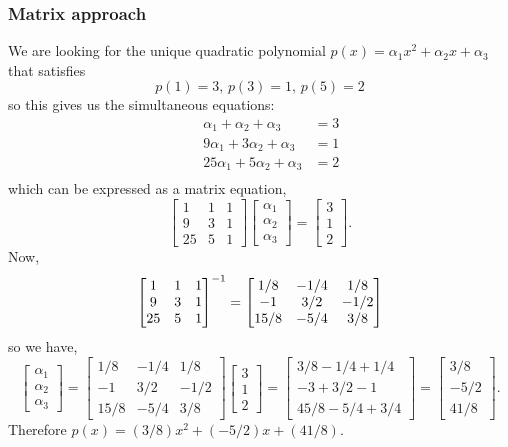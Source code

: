 \documentclass[MathsNotesBase.tex]{subfiles}
\begin{document}
{	\bigskip\bigskip
	\subsubsection{Matrix approach}
	\bigskip
	We are looking for the unique quadratic polynomial ${ p(x) = \alpha_1x^2 + \alpha_2x + \alpha_3 }$ that satisfies
	\[ p(1)=3,\, p(3)=1,\, p(5)=2 \]
	so this gives us the simultaneous equations:
	\begin{align*}
	&& \alpha_1 + \alpha_2 + \alpha_3 &= 3 \\
	&& 9\alpha_1 + 3\alpha_2 + \alpha_3 &= 1 \\
	&& 25\alpha_1 + 5\alpha_2 + \alpha_3 &= 2 \\
	\end{align*}
	which can be expressed as a matrix equation,
	\[ 
		\begin{bmatrix}
		1 & 1 & 1\\
		9 & 3 & 1\\
		25 & 5 & 1
		\end{bmatrix}
		\begin{bmatrix}\alpha_1\\\alpha_2\\\alpha_3\end{bmatrix} 
		=
		\begin{bmatrix}3\\1\\2\end{bmatrix}.
	\]
	Now,
	\[ 
		{\begin{bmatrix}
			1 & 1 & 1\\
			9 & 3 & 1\\
			25 & 5 & 1
			\end{bmatrix}}^{-1} 
		=
		\begin{bmatrix}
		1/8  & -1/4 & 1/8\\
		-1   & 3/2  & -1/2\\
		15/8 & -5/4 & 3/8
		\end{bmatrix}
	\]
	so we have,
	\[
		 \begin{bmatrix}\alpha_1\\\alpha_2\\\alpha_3\end{bmatrix} 
		 =
		 \begin{bmatrix}
		 1/8  & -1/4 & 1/8\\
		 -1   & 3/2  & -1/2\\
		 15/8 & -5/4 & 3/8
		 \end{bmatrix}
		 \begin{bmatrix}3\\1\\2\end{bmatrix}
		 =
		 \begin{bmatrix}
		 3/8 - 1/4 + 1/4\\
		 -3 + 3/2 - 1\\
		 45/8 - 5/4 + 3/4
		 \end{bmatrix}
		 =
		 \begin{bmatrix}3/8\\-5/2\\41/8\end{bmatrix}.
	\]
	Therefore ${ p(x) = (3/8)x^2 + (-5/2)x + (41/8) }$.
	
}
\end{document}
